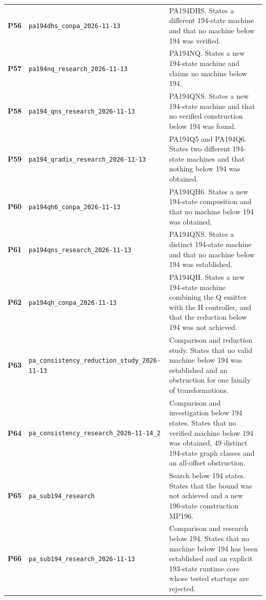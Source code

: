 \begin{longtable}{@{}>{\raggedright\arraybackslash}p{.055\linewidth}>{\raggedright\arraybackslash}p{.355\linewidth}>{\raggedright\arraybackslash}p{.55\linewidth}@{}}
\hypertarget{packet-P56}{\textbf{P56}} & \nolinkurl{pa194dhs_conpa_2026-11-13} & PA194DHS. States a different 194-state machine and that no machine below 194 was verified.\\[3pt]
\hypertarget{packet-P57}{\textbf{P57}} & \nolinkurl{pa194nq_research_2026-11-13} & PA194NQ. States a new 194-state machine and claims no machine below 194.\\[3pt]
\hypertarget{packet-P58}{\textbf{P58}} & \nolinkurl{pa194_qns_research_2026-11-13} & PA194QNS. States a new 194-state machine and that no verified construction below 194 was found.\\[3pt]
\hypertarget{packet-P59}{\textbf{P59}} & \nolinkurl{pa194_qradix_research_2026-11-13} & PA194Q5 and PA194Q6. States two different 194-state machines and that nothing below 194 was obtained.\\[3pt]
\hypertarget{packet-P60}{\textbf{P60}} & \nolinkurl{pa194qh6_conpa_2026-11-13} & PA194QH6. States a new 194-state composition and that no machine below 194 was obtained.\\[3pt]
\hypertarget{packet-P61}{\textbf{P61}} & \nolinkurl{pa194qns_research_2026-11-13} & PA194QNS. States a distinct 194-state machine and that no machine below 194 was established.\\[3pt]
\hypertarget{packet-P62}{\textbf{P62}} & \nolinkurl{pa194qh_conpa_2026-11-13} & PA194QH. States a new 194-state machine combining the Q emitter with the H controller, and that the reduction below 194 was not achieved.\\[3pt]
\hypertarget{packet-P63}{\textbf{P63}} & \nolinkurl{pa_consistency_reduction_study_2026-11-13} & Comparison and reduction study. States that no valid machine below 194 was established and an obstruction for one family of transformations.\\[3pt]
\hypertarget{packet-P64}{\textbf{P64}} & \nolinkurl{pa_consistency_research_2026-11-14_2} & Comparison and investigation below 194 states. States that no verified machine below 194 was obtained, 49 distinct 194-state graph classes and an all-offset obstruction.\\[3pt]
\hypertarget{packet-P65}{\textbf{P65}} & \nolinkurl{pa_sub194_research} & Search below 194 states. States that the bound was not achieved and a new 196-state construction MP196.\\[3pt]
\hypertarget{packet-P66}{\textbf{P66}} & \nolinkurl{pa_sub194_research_2026-11-13} & Comparison and research below 194. States that no machine below 194 has been established and an explicit 193-state runtime core whose tested startups are rejected.\\[3pt]

\end{longtable}
